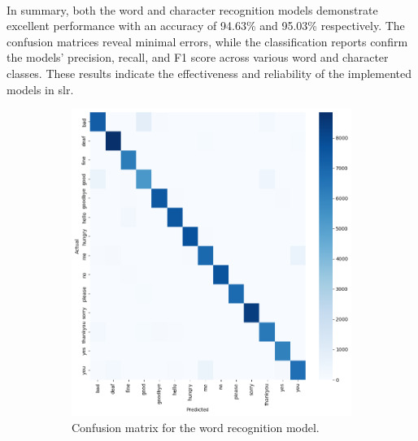\paragraph{}
In summary, both the word and character recognition models demonstrate excellent performance with an accuracy of 94.63\% and 95.03\% respectively. The confusion matrices reveal minimal errors, while the classification reports confirm the models' precision, recall, and F1 score across various word and character classes. These results indicate the effectiveness and reliability of the implemented models in \ac{slr}.
\begin{figure}[h]
	\centering
	\begin{subfigure}[b]{0.6\textwidth}
		\includegraphics[width=\textwidth]{images/confusion_matrix_words}
		\caption{Confusion matrix for the word recognition model.}
		\label{fig:words_confusion_matrix}
	\end{subfigure}
	\begin{subfigure}[b]{0.6\textwidth}

\end{subfigure}
\end{figure}
